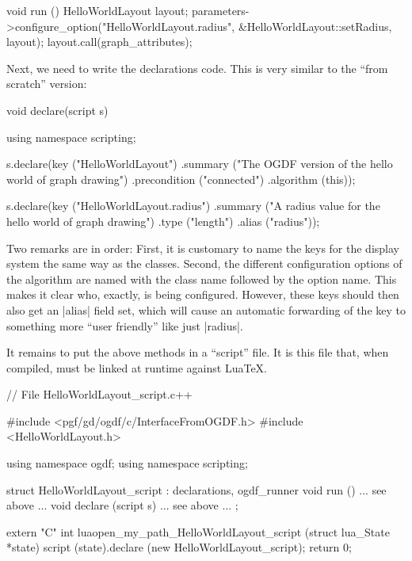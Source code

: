 \begin{codeexample}
void run ()
{
  HelloWorldLayout layout;
  parameters->configure_option("HelloWorldLayout.radius", &HelloWorldLayout::setRadius, layout);
  layout.call(graph_attributes);
}
\end{codeexample}

Next, we need to write the declarations code. This is very similar to the
``from scratch'' version:

\begin{codeexample}
void declare(script s) {
  using namespace scripting;

  s.declare(key ("HelloWorldLayout")
            .summary ("The OGDF version of the hello world of graph drawing")
            .precondition ("connected")
            .algorithm (this));
    
  s.declare(key ("HelloWorldLayout.radius")
            .summary ("A radius value for the hello world of graph drawing")
            .type ("length")
            .alias ("radius"));
}
\end{codeexample}

Two remarks are in order: First, it is customary to name the keys for
the display system the same way as the classes. Second, the different
configuration options of the algorithm are named with the class name
followed by the option name. This makes it clear who, exactly, is
being configured. However, these keys should then also get an |alias|
field set, which will cause an automatic forwarding of the key to
something more ``user friendly'' like just |radius|. 

It remains to put the above methods in a ``script'' file. It is this
file that, when compiled, must be linked at runtime against Lua\TeX.

\begin{codeexample}
// File HelloWorldLayout_script.c++

#include <pgf/gd/ogdf/c/InterfaceFromOGDF.h>
#include <HelloWorldLayout.h>

using namespace ogdf;
using namespace scripting;

struct HelloWorldLayout_script : declarations, ogdf_runner {
  void run ()             { ... see above ... }
  void declare (script s) { ... see above ... }
};

extern "C" int luaopen_my_path_HelloWorldLayout_script (struct lua_State *state) {
  script (state).declare (new HelloWorldLayout_script);
  return 0;
}
\end{codeexample}


